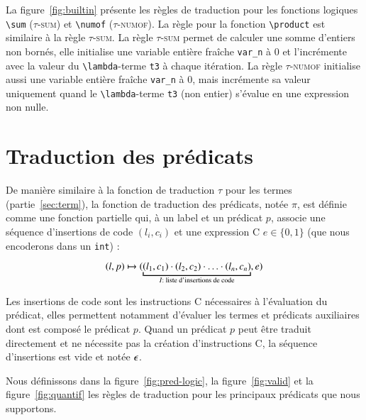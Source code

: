 La figure~\ref{fig:builtin} présente les règles de traduction pour les fonctions
logiques \lstinline|\sum| (\textsc{$\tau$-sum}) et \lstinline|\numof|
(\textsc{$\tau$-numof}).
La règle pour la fonction \lstinline|\product| est similaire à la règle
\textsc{$\tau$-sum}.
La règle \textsc{$\tau$-sum} permet de calculer une somme d'entiers non bornés,
elle initialise une variable entière fraîche \lstinline|var_n| à $0$ et
l'incrémente avec la valeur du \lstinline|\lambda|-terme \lstinline't3' à chaque
itération.
La règle \textsc{$\tau$-numof} initialise aussi une variable entière fraîche
\lstinline|var_n| à $0$, mais incrémente sa valeur uniquement quand le
\lstinline|\lambda|-terme \lstinline't3' (non entier) s'évalue en une expression
non nulle.


\section{Traduction des prédicats \eacsl}
\label{sec:pred}


De manière similaire à la fonction de traduction $\tau$ pour les termes
(partie~\ref{sec:term}), la fonction de traduction des prédicats, notée $\pi$,
est définie comme une fonction partielle qui, à un label et un prédicat \eacsl
$p$, associe une séquence d'insertions de code $(l_i, c_i)$ et une expression C
$e \in \{0, 1\}$ (que nous encoderons dans un \lstinline'int') :

\[
(l, p) \rulearrow (\underbracket{(l_1, c_1) \concat (l_2, c_2) \concat \ldots
  \concat (l_n, c_n)}_{I : \text{ liste d'insertions de code}}, e)
\]

Les insertions de code sont les instructions C nécessaires à l'évaluation du
prédicat, elles permettent notamment d'évaluer les termes et prédicats
auxiliaires dont est composé le prédicat $p$.
Quand un prédicat $p$ peut être traduit directement et ne nécessite pas la
création d'instructions C, la séquence d'insertions est vide et notée
$\epsilon$.

Nous définissons dans la figure~\ref{fig:pred-logic}, la figure~\ref{fig:valid}
et la figure~\ref{fig:quantif} les règles de traduction pour les principaux
prédicats \eacsl que nous supportons.

